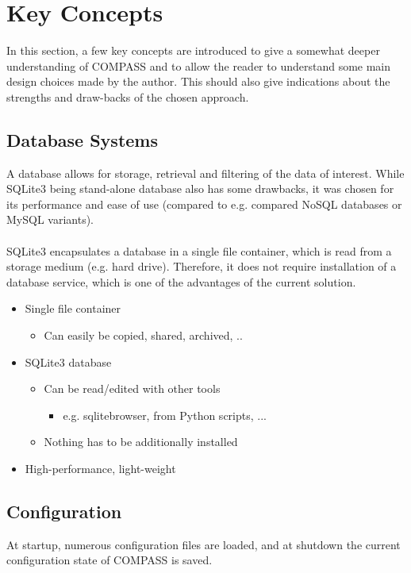 \section{Key Concepts}
\label{sec:key_concepts}

In this section, a few key concepts are introduced to give a somewhat deeper understanding of COMPASS and to allow the reader to understand some main design choices made by the author. This should also give indications about the strengths and draw-backs of the chosen approach.

\subsection*{Database Systems}
A database allows for storage, retrieval and filtering of the data of interest. While SQLite3 being stand-alone database also has some drawbacks, it was chosen for its performance and ease of use (compared to e.g. compared NoSQL databases or MySQL variants). \\\\
SQLite3 encapsulates a database in a single file container, which is read from a storage medium (e.g. hard drive). Therefore, it does not require installation of a database service, which is one of the advantages of the current solution. \\

\begin{itemize}
\item Single file container
\begin{itemize}
\item Can easily be copied, shared, archived, ..
\end{itemize}
\item SQLite3 database
\begin{itemize}
\item Can be read/edited with other tools
\begin{itemize}
\item e.g. sqlitebrowser, from Python scripts, ...
\end{itemize}
\item Nothing has to be additionally installed
\end{itemize}
\item High-performance, light-weight
\end{itemize}

\subsection*{Configuration}
At startup, numerous configuration files are loaded, and at shutdown the current configuration state of COMPASS is saved.\\\\

